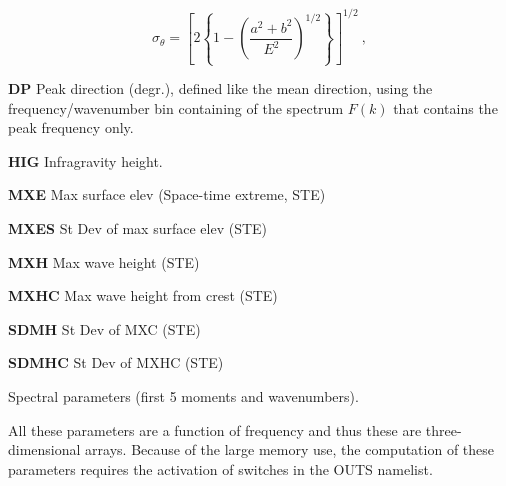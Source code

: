 \begin{list}{)\hfill}
\begin{list}{)\hfill}
      \begin{equation} \sigma_\theta = \left [ 2 \left \{ 1 - \left (
      \frac{a^2+b^2}{E^2} \right )^{1/2} \right \} \right ]^{1/2}
      \: , \label{eq:sig_th} \end{equation}
\item \textbf{DP} Peak direction (degr.), defined like the mean direction, using the
      frequency/wavenumber bin containing of the spectrum $F(k)$ that
      contains the peak frequency only.
\item \textbf{HIG} Infragravity height.
\item \textbf{MXE}   Max surface elev (Space-time extreme, STE)
\item \textbf{MXES}  St Dev of max surface elev (STE)
\item \textbf{MXH}  Max wave height (STE)
\item \textbf{MXHC}  Max wave height from crest (STE)
\item \textbf{SDMH}  St Dev of MXC (STE)
\item \textbf{SDMHC} St Dev of MXHC (STE)           
\end{list}

\item{Spectral parameters (first 5 moments and wavenumbers). 

All these parameters are a function 
of frequency and thus these are three-dimensional arrays. Because of the large memory use, the 
computation of these parameters requires the activation of switches in the {\F OUTS} namelist.}

\begin{list}{)\hfill}
            { \leftmargin 8mm 
             \rightmargin 0mm \itemsep 0mm \parsep 0mm}
   

\end{list}
\end{list}
